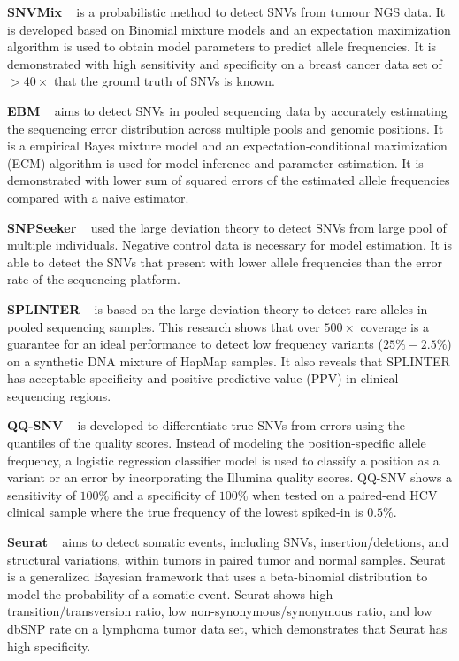 \documentclass[11pt,reqno]{amsart}
\begin{document}
\textbf{SNVMix} ~\citep{Goya2010} is a probabilistic method to detect SNVs from tumour NGS data.
It is developed based on Binomial mixture models and an expectation maximization algorithm is used to obtain model parameters to predict allele frequencies.
It is demonstrated with high sensitivity and specificity on a breast cancer data set of $> 40 \times$ that the ground truth of SNVs is known.

\textbf{EBM} ~\citep{Zhou2012} aims to detect SNVs in pooled sequencing data by accurately estimating the sequencing error distribution across multiple pools and genomic positions. 
It is a empirical Bayes mixture model and an expectation-conditional maximization (ECM) algorithm is used for model inference and parameter estimation.
It is demonstrated with lower sum of squared errors of the estimated allele frequencies compared with a naive estimator.

\textbf{SNPSeeker} ~\citep{Druley2009} used the large deviation theory to detect SNVs from large pool of multiple individuals.
Negative control data is necessary for model estimation.
It is able to detect the SNVs that present with lower allele frequencies than the error rate of the sequencing platform.

\textbf{SPLINTER} ~\citep{Spencer2014} is based on the large deviation theory to detect rare alleles in pooled sequencing samples.
This research shows that over $500 \times$ coverage is a guarantee for an ideal performance to detect low frequency variants ($25\% - 2.5\%$) on a synthetic DNA mixture of HapMap samples.
It also reveals that SPLINTER has acceptable specificity and positive predictive value (PPV) in clinical sequencing regions.

\textbf{QQ-SNV} ~\citep{VanderBorght2015} is developed to differentiate true SNVs from errors using the quantiles of the quality scores.
Instead of modeling the position-specific allele frequency, a logistic regression classifier model is used to classify a position as a variant or an error by incorporating the Illumina quality scores.
QQ-SNV shows a sensitivity of $100\%$ and a specificity of $100\%$ when tested on a paired-end HCV clinical sample where the true frequency of the lowest spiked-in is $0.5\%$.

\textbf{Seurat} ~\citep{Christoforides2013} aims to detect somatic events, including SNVs, insertion/deletions, and structural variations, within tumors in paired tumor and normal samples.
Seurat is a generalized Bayesian framework that uses a beta-binomial distribution to model the probability of a somatic event.
Seurat shows high transition/transversion ratio, low non-synonymous/synonymous ratio, and low dbSNP rate on a lymphoma tumor data set, which demonstrates that Seurat has high specificity.
\end{document}
